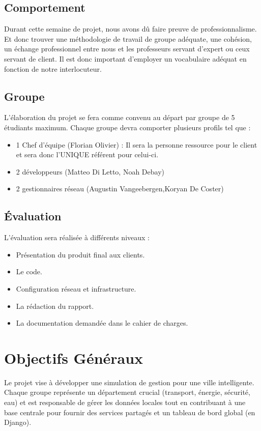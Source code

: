 \documentclass[a4paper,12pt]{report}
\begin{document}
\section{Comportement}
Durant cette semaine de projet, nous avons dû faire preuve de professionnalisme. Et donc trouver une méthodologie de travail de groupe adéquate, une cohésion, un échange professionnel entre nous et les professeurs servant d'expert ou ceux servant de client. Il est donc important d'employer un vocabulaire adéquat en fonction de notre interlocuteur.

\section{Groupe}
L'élaboration du projet se fera comme convenu au départ par groupe de 5 étudiants maximum. Chaque groupe devra comporter plusieurs profils tel que :
\begin{itemize}
    \item 1 Chef d'équipe (Florian Olivier) : Il sera la personne ressource pour le client et sera donc l'UNIQUE référent pour celui-ci. 
    \item 2 développeurs (Matteo Di Letto, Noah Debay) 
    \item 2 gestionnaires réseau (Augustin Vangeebergen,Koryan De Coster) 
\end{itemize}

\section{Évaluation}
L'évaluation sera réalisée à différents niveaux :
\begin{itemize}
    \item Présentation du produit final aux clients.
    \item Le code.
    \item Configuration réseau et infrastructure.
    \item La rédaction du rapport.
    \item La documentation demandée dans le cahier de charges.
\end{itemize}

\chapter{Objectifs Généraux}
Le projet vise à développer une simulation de gestion pour une ville intelligente. Chaque groupe représente un département crucial (transport, énergie, sécurité, eau) et est responsable de gérer les données locales tout en contribuant à une base centrale pour fournir des services partagés et un tableau de bord global (en Django).
\end{document}
